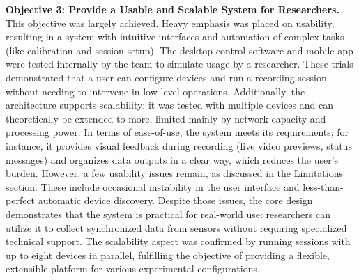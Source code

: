 \textbf{Objective 3: Provide a Usable and Scalable System for Researchers.} This objective was largely achieved. Heavy emphasis was placed on usability, resulting in a system with intuitive interfaces and automation of complex tasks (like calibration and session setup). The desktop control software and mobile app were tested internally by the team to simulate usage by a researcher. These trials demonstrated that a user can configure devices and run a recording session without needing to intervene in low-level operations. Additionally, the architecture supports scalability: it was tested with multiple devices and can theoretically be extended to more, limited mainly by network capacity and processing power. In terms of ease-of-use, the system meets its requirements; for instance, it provides visual feedback during recording (live video previews, status messages) and organizes data outputs in a clear way, which reduces the user's burden. However, a few usability issues remain, as discussed in the Limitations section. These include occasional instability in the user interface and less-than-perfect automatic device discovery. Despite those issues, the core design demonstrates that the system is practical for real-world use: researchers can utilize it to collect synchronized data from sensors without requiring specialized technical support. The scalability aspect was confirmed by running sessions with up to eight devices in parallel, fulfilling the objective of providing a flexible, extensible platform for various experimental configurations.

